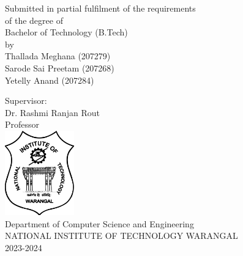 \begin{titlepage}
   \begin{center}

       \vspace{0.5cm}
        Submitted in partial fulfilment of the requirements \\ 
        \vspace{0.5cm}
        of the degree of \\
        \vspace{0.5cm}
        Bachelor of Technology (B.Tech) \\ 
        \vspace{0.5cm}
        by\\
        \vspace{0.5cm}
        Thallada Meghana (207279)\\
        \vspace{0.5cm}
        Sarode Sai Preetam (207268)\\
        \vspace{0.5cm}
        Yetelly Anand (207284)
            
       \vspace{1cm}
        Supervisor:\\
       \vspace{0.5cm}
       Dr. Rashmi Ranjan Rout\\
       Professor\\
      \vspace{2.5cm}
       \includegraphics[width=30mm]{uglo}
      \\
      \vspace{1.5cm}   
       Department of Computer Science and Engineering\\
       \vspace{0.5cm}
       NATIONAL INSTITUTE OF TECHNOLOGY WARANGAL\\
       \vspace{0.5cm}
       2023-2024\\
       \date{\today}
            
   \end{center}
\end{titlepage}